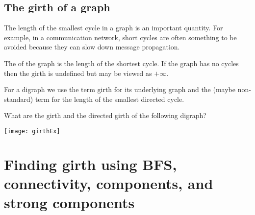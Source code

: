 %
%

%

\section{The girth of a graph} \label{sec:girth}
The length of the smallest cycle in a graph is an important quantity. 
For example, in a communication network, short cycles are often something to be
avoided because they can slow down message propagation.

\begin{Definition}
The  of the graph is the length of the shortest cycle. If the graph has no cycles then the
girth is undefined but may be viewed as $+\infty$. 

For a digraph we use the term girth for its underlying graph and the (maybe non-standard) term  for
the length of the smallest directed cycle.
\end{Definition}

\begin{Boxample}[0]
What are the girth and the directed girth of the following digraph?
\begin{center}
\texttt{[image: girthEx]}
\end{center}
\end{Boxample}




\chapter{Finding girth using BFS, connectivity, components, and strong components} %

